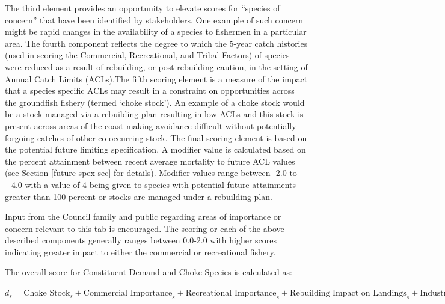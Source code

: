 \documentclass[11pt,
  english,
  a4paper,
]{article}
\begin{document}
The third element provides an opportunity to elevate scores for ``species of concern'' that have been identified by stakeholders. One example of such concern might be rapid changes in the availability of a species to fishermen in a particular area. The fourth component reflects the degree to which the 5-year catch histories (used in scoring the Commercial, Recreational, and Tribal Factors) of species were reduced as a result of rebuilding, or post-rebuilding caution, in the setting of Annual Catch Limits (ACLs).The fifth scoring element is a measure of the impact that a species specific ACLs may result in a constraint on opportunities across the groundfish fishery (termed `choke stock'). An example of a choke stock would be a stock managed via a rebuilding plan resulting in low ACLs and this stock is present across areas of the coast making avoidance difficult without potentially forgoing catches of other co-occurring stock. The final scoring element is based on the potential future limiting specification. A modifier value is calculated based on the percent attainment between recent average mortality to future ACL values (see Section \ref{future-spex-sec} for details). Modifier values range between -2.0 to +4.0 with a value of 4 being given to species with potential future attainments greater than 100 percent or stocks are managed under a rebuilding plan.

\leavevmode\tagmcend\tagstructend\par


Input from the Council family and public regarding areas of importance or concern relevant to this tab is encouraged. The scoring or each of the above described components generally ranges between 0.0-2.0 with higher scores indicating greater impact to either the commercial or recreational fishery.

\leavevmode\tagmcend\tagstructend\par


The overall score for Constituent Demand and Choke Species is calculated as:

\leavevmode\tagmcend\tagstructend\par

\begin{centering}

$d_s = \text{Choke Stock}_s + \text{Commercial Importance}_s + \text{Recreational Importance}_s + \text{Rebuilding Impact on Landings}_s + \text{Industry Concern}_s + \text{Future Limiting}_s$

\end{centering}
\end{document}
